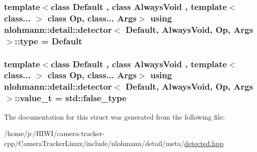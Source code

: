 \subsubsection[{\texorpdfstring{type}{type}}]{\setlength{\rightskip}{0pt plus 5cm}template$<$class Default , class Always\+Void , template$<$ class... $>$ class Op, class... Args$>$ using {\bf nlohmann\+::detail\+::detector}$<$ Default, Always\+Void, Op, Args $>$\+::{\bf type} =  Default}\hypertarget{structnlohmann_1_1detail_1_1detector_a0cd69423587748bf3d3d702cc7b7c2ce}{}\label{structnlohmann_1_1detail_1_1detector_a0cd69423587748bf3d3d702cc7b7c2ce}
\subsubsection[{\texorpdfstring{value\+\_\+t}{value_t}}]{\setlength{\rightskip}{0pt plus 5cm}template$<$class Default , class Always\+Void , template$<$ class... $>$ class Op, class... Args$>$ using {\bf nlohmann\+::detail\+::detector}$<$ Default, Always\+Void, Op, Args $>$\+::{\bf value\+\_\+t} =  std\+::false\+\_\+type}\hypertarget{structnlohmann_1_1detail_1_1detector_a5a132aab543d1706e2439268faf8d487}{}\label{structnlohmann_1_1detail_1_1detector_a5a132aab543d1706e2439268faf8d487}


The documentation for this struct was generated from the following file\+:\begin{DoxyCompactItemize}
\item 
/home/jc/\+H\+I\+W\+I/camera-\/tracker-\/cpp/\+Camera\+Tracker\+Linux/include/nlohmann/detail/meta/\hyperlink{detected_8hpp}{detected.\+hpp}\end{DoxyCompactItemize}
